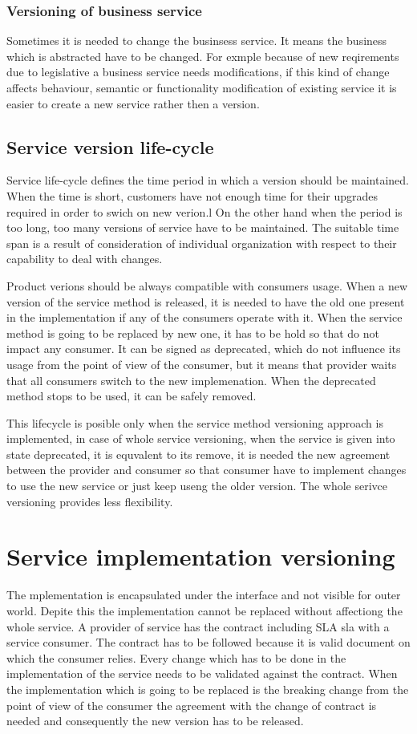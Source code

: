 \subsubsection{\textbf{Versioning of business service}}
Sometimes it is needed to change the businsess service. It means the business which is abstracted have to be changed. For exmple because of new reqirements due to legislative a business service needs modifications, if this kind of change affects behaviour, semantic or functionality modification of existing service it is easier to create a new service rather then a version. 


\subsection{Service version life-cycle}
Service life-cycle defines the time period in which a version should be maintained. When the time is short, customers have not enough time for their upgrades required in order to swich on new verion.l On the other hand when the period is too long, too many versions of service have to be maintained. The suitable time span is a result of consideration of individual organization with respect to their capability to deal with changes.

Product verions should be always compatible with consumers usage. When a new version of the service method is released, it is needed to have the old one present in the implementation if any of the consumers operate with it. When the service method is going to be replaced by new one, it has to be hold so that do not impact any consumer. It can be signed as deprecated, which do not influence its usage from the point of view of the consumer, but it means that provider waits that all consumers switch to the new implemenation. When the deprecated method stops to be used, it can be safely removed. 

This lifecycle is posible only when the service method versioning approach is implemented, in case of whole service versioning, when the service is given into state deprecated, it is equvalent to its remove, it is needed the new agreement between the provider and consumer so that consumer have to implement changes to use the new service or just  keep useng the older version. The whole serivce versioning provides less flexibility.

\section{Service implementation versioning}
\label{sec:implversioning}
The mplementation is encapsulated under the interface and not visible for outer world. Depite this the implementation cannot be replaced without affectiong the whole service. A provider of service has the contract including SLA \gls{sla} with a service consumer. The contract has to be followed because it is valid document on which the consumer relies. 
Every change which has to be done in the implementation of the service needs to be validated against the contract. When the implementation which is going to be replaced is the breaking change from the point of view of the consumer the agreement with the change of contract is needed and consequently the new version has to be released.


